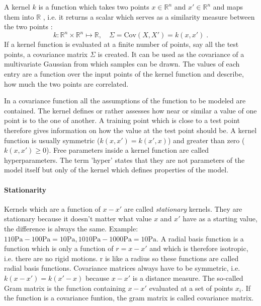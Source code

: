 \documentclass[%
  a4paper,oneside,%
  11pt,%
  smallchapters,
  style=printdev,
  extramargin,
  green,%
  rgb, <cmyk>
  ]{tubsbook}
\begin{document}
A kernel $k$ is a function which takes two points $x \in \mathbb{R}^n$ and $x' \in \mathbb{R}^n$ and maps them into $\mathbb{R}$ \cite[p.80]{rasmussen2006}, i.e. it returns a scalar which serves as a similarity measure between the two points \cite{gortler2019}:
%
\begin{equation}
k: \mathbb{R}^n \times \mathbb{R}^n \mapsto \mathbb{R}, \quad \Sigma = \mathrm{Cov}(X,X') = k(x,x') \;.
\end{equation}
%
If a kernel function is evaluated at a finite number of points, say all the test points, a covariance matrix $\Sigma$ is created. It can be used as the covariance of a multivariate Gaussian from which samples can be drawn. The values of each entry are a function over the input points of the kernel function and describe, how much the two points are correlated. \cite[p.14]{rasmussen2006}

In a covariance function all the assumptions of the function to be modeled are contained. The kernel defines or rather assesses how near or similar a value of one point is to the one of another. A training point which is close to a test point therefore gives information on how the value at the test point should be. \cite[p.79]{rasmussen2006}
A kernel function is usually symmetric ($k(x,x') = k(x',x)$) and greater than zero ($k(x,x') \geq 0$). \cite[p.481]{murphy2012}
Free parameters inside a kernel function are called hyperparameters. The term 'hyper' states that they are not parameters of the model itself but only of the kernel which defines properties of the model.

\paragraph{Stationarity}
Kernels which are a function of $x-x'$ are called \emph{stationary} kernels. They are stationary because it doesn't matter what value $x$ and $x'$ have as a starting value, the difference is always the same. Example: $110\mathrm{Pa} -100\mathrm{Pa} = 10\mathrm{Pa}, 1010\mathrm{Pa}-1000\mathrm{Pa} = 10\mathrm{Pa}$.
%
A radial basis function is a function which is only a function of $r=x-x'$ and which is therefore isotropic, i.e. there are no rigid motions. r is like a radius so these functions are called radial basis functions. \cite[p.80]{rasmussen2006} 
Covariance matrices always have to be symmetric, i.e. $k(x-x') = k(x'-x)$ because $x-x'$ is a distance measure.
The so-called Gram matrix is the function containing $x-x'$ evaluated at a set of points $x_i$. If the function is a covariance funtion, the gram matrix is called covariance matrix.
\end{document}
